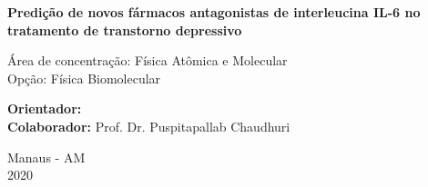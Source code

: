 \begin{center}


\vspace{2cm}

\textbf{Predição de novos fármacos antagonistas de interleucina IL-6 no tratamento de transtorno depressivo}

\vspace{6.0cm}


\begin{flushright}
\parbox{8cm}{
}

Área de concentração: Física Atômica e Molecular \\
Opção: Física Biomolecular

\vspace{1.0cm}
\textbf{Orientador:} \theadvisor\\
\textbf{Colaborador:} Prof. Dr. Puspitapallab Chaudhuri
\end{flushright}

\par\vfill

Manaus - AM\\2020

\end{center}